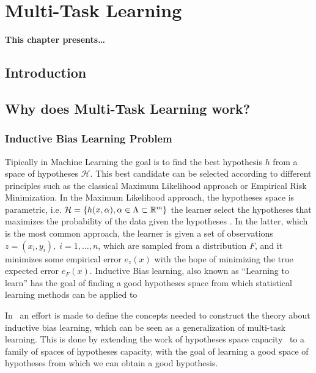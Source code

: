 
\chapter{Multi-Task Learning} %
\label{Chapter2}

{\bf \small{
This chapter presents\dots
}}

\section{Introduction}



\section{Why does Multi-Task Learning work?}
% 
\subsection{Inductive Bias Learning Problem} %
Tipically in Machine Learning the goal is to find the best hypothesis $h$ from a space of hypotheses $\mathcal{H}$. This best candidate can be selected according to different principles such as the classical Maximum Likelihood approach or Empirical Risk Minimization. 
In the Maximum Likelihood approach, the hypotheses space is parametric, i.e. $\mathcal{H} = \left\{h(x, \alpha), \alpha \in \Lambda \subset \mathbb{R}^m\right\}$ the learner select the hypotheses that maximizes the probability of the data given the hypotheses .
In the latter, which is the most common approach, the learner is given a set of observations $z=(x_i, y_i),\; i=1, \ldots, n$, which are sampled from a distribution $F$, and it minimizes some empirical error $e_z(x)$ with the hope of minimizing the true expected error $e_F(x)$. 
Inductive Bias learning, also known as ``Learning to learn'' has the goal of finding a good hypotheses space from which statistical learning methods can be applied to 

In~\cite{baxter2000model} an effort is made to define the concepts needed to construct the theory about inductive bias learning, which can be seen as a generalization of multi-task learning. This is done by extending the work of hypotheses space capacity~\cite{vapnik2013nature} to a family of spaces of hypotheses capacity, with the goal of learning a good space of hypotheses from which we can obtain a good hypothesis.


